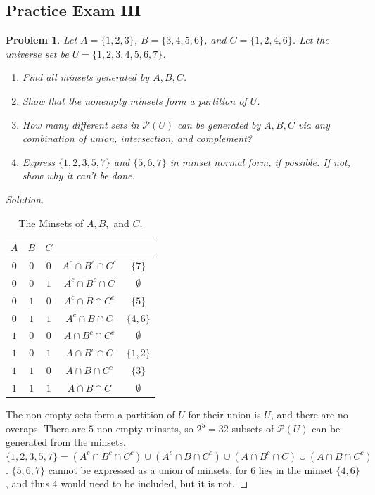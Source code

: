 \documentclass[oneside]{book}
\theoremstyle{mystyle}
\newtheorem{problem}{Problem}[section]
\begin{document}
\subsection{Practice Exam III}
\begin{problem}
Let $A= \{1,2,3\}$, $B = \{3,4,5,6\}$, and $C = \{1,2,4,6\}$. Let the universe set be $U = \{1,2,3,4,5,6,7\}$. 
\begin{enumerate}
    \item Find all minsets generated by $A,B,C$.
    \item Show that the nonempty minsets form a partition of $U$.
    \item How many different sets in $\mathcal{P}(U)$ can be generated by $A,B,C$ via any combination of union, intersection, and complement?
    \item Express $\{1,2,3,5,7\}$ and $\{5,6,7\}$ in minset normal form, if possible. If not, show why it can't be done.
\end{enumerate}
\end{problem}
\begin{proof}[Solution]
\begin{table}[H]
    \centering
    \begin{tabular}{c c c c c}
        \hline
        $A$ & $B$ & $C$ & &  \\ [0.5ex] 
        \hline
        $0$ & $0$ & $0$ & $A^c\cap B^c\cap C^c$ & $\{7\}$\\
        $0$ & $0$ & $1$ & $A^c\cap B^c\cap C$ & $\emptyset$\\
        $0$ & $1$ & $0$ & $A^c\cap B\cap C^c$ & $\{5\}$\\
        $0$ & $1$ & $1$ & $A^c\cap B \cap C$ & $\{4,6\}$\\
        $1$ & $0$ & $0$ & $A\cap B^c\cap C^c$ & $\emptyset$\\
        $1$ & $0$ & $1$ & $A\cap B^c\cap C$ & $\{1,2\}$\\
        $1$ & $1$ & $0$ & $A\cap B\cap C^c$ & $\{3\}$\\
        $1$ & $1$ & $1$ & $A\cap B \cap C$ & $\emptyset$\\
        \hline
    \end{tabular}
    \caption{The Minsets of $A,B,$ and $C$.}
    \label{tab:discrete_structures_practice_exam_III_Problem_1}
\end{table}
The non-empty sets form a partition of $U$ for their union is $U$, and there are no overaps. There are $5$ non-empty minsets, so $2^{5} = 32$ subsets of $\mathcal{P}(U)$ can be generated from the minsets. $\{1,2,3,5,7\} = (A^c\cap B^c \cap C^c)\cup (A^c\cap B\cap C^c)\cup (A\cap B^c\cap C)\cup (A\cap B\cap C^c)$. $\{5,6,7\}$ cannot be expressed as a union of minsets, for $6$ lies in the minset $\{4,6\}$, and thus $4$ would need to be included, but it is not.
\end{proof}
\end{document}
